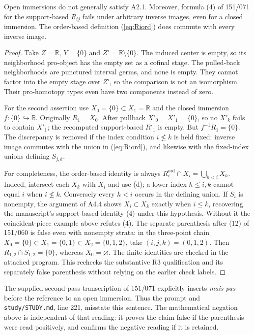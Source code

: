 \begin{result}\label{A2.2}
Open immersions do not generally satisfy A2.1. Moreover, formula (4) of
151/071 for the support-based $R_{ij}$ fails under arbitrary inverse
images, even for a closed immersion. The order-based definition
(\ref{eq:Riord}) does commute with every inverse image.
\end{result}
\begin{proof}
Take $Z=\mathbb R$, $Y=\{0\}$ and $Z'=\mathbb R\setminus\{0\}$.
The induced center is empty, so its neighborhood pro-object has the empty
set as a cofinal stage. The pulled-back neighborhoods are punctured
interval germs, and none is empty. They cannot factor into the empty
stage over $Z'$, so the comparison is not an isomorphism. Their pro-homotopy
types even have two components instead of zero.

For the second assertion use $X_0=\{0\}\subset X_1=\mathbb R$ and the
closed immersion $f:\{0\}\hookrightarrow\mathbb R$. Originally $R_1=X_0$.
After pullback $X'_0=X'_1=\{0\}$, so no $X'_k$ fails to contain $X'_1$;
the recomputed support-based $R'_1$ is empty. But $f^{-1}R_1=\{0\}$.
The discrepancy is removed if the index condition $i\nleq k$ is held
fixed: inverse image commutes with the union in (\ref{eq:Riord}), and
likewise with the fixed-index unions defining $S_{j,k}$.

For completeness, the order-based identity is always
$R_i^{\mathrm{ord}}\cap X_i=\bigcup_{h<i}X_h$. Indeed, intersect each
$X_k$ with $X_i$ and use (d); a lower index $h\leq i,k$ cannot equal
$i$ when $i\nleq k$. Conversely every $h<i$ occurs in the defining
union. If $S_i$ is nonempty, the argument of A4.4 shows
$X_i\subset X_k$ exactly when $i\leq k$, recovering the manuscript's
support-based identity (4) under this hypothesis. Without it the
coincident-piece example above refutes (4). The separate parenthesis
after (12) of 151/060 is false even with nonempty strata: in the
three-point chain $X_0=\{0\}\subset X_1=\{0,1\}\subset
X_2=\{0,1,2\}$, take $(i,j,k)=(0,1,2)$. Then
$R_{1,2}\cap S_{1,2}=\{0\}$, whereas $\dot X_0=\varnothing$.
The finite identities are checked in the attached program. This
rechecks the substantive R3 qualification and its separately false
parenthesis without relying on the earlier check labels.
\end{proof}

The supplied second-pass transcription of 151/071 explicitly inserts
\emph{mais pas} before the reference to an open immersion. Thus the prompt
and \texttt{study/STUDY.md}, line 221, misstate this sentence. The
mathematical negation above is independent of that reading: it proves the
claim false if the parenthesis were read positively, and confirms the
negative reading if it is retained.

